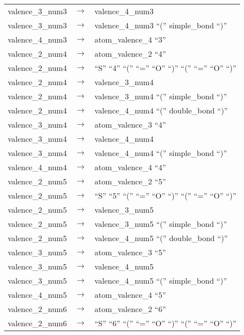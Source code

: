 \documentclass[../Document.tex]{subfiles}
\begin{document}
\begin{longtable}{m{} p{} p{}}
    valence\_3\_num3 & $\rightarrow$ & valence\_4\_num3 \\
    valence\_3\_num3 & $\rightarrow$ & valence\_4\_num3 ``('' simple\_bond ``)'' \\
    valence\_4\_num3 & $\rightarrow$ & atom\_valence\_4 ``3'' \\
    valence\_2\_num4 & $\rightarrow$ & atom\_valence\_2 ``4'' \\
    valence\_2\_num4 & $\rightarrow$ & ``S'' ``4'' ``('' ``='' ``O'' ``)'' ``('' ``='' ``O'' ``)'' \\
    valence\_2\_num4 & $\rightarrow$ & valence\_3\_num4 \\
    valence\_2\_num4 & $\rightarrow$ & valence\_3\_num4 ``('' simple\_bond ``)'' \\
    valence\_2\_num4 & $\rightarrow$ & valence\_4\_num4 ``('' double\_bond ``)'' \\
    valence\_3\_num4 & $\rightarrow$ & atom\_valence\_3 ``4'' \\
    valence\_3\_num4 & $\rightarrow$ & valence\_4\_num4 \\
    valence\_3\_num4 & $\rightarrow$ & valence\_4\_num4 ``('' simple\_bond ``)'' \\
    valence\_4\_num4 & $\rightarrow$ & atom\_valence\_4 ``4'' \\
    valence\_2\_num5 & $\rightarrow$ & atom\_valence\_2 ``5'' \\
    valence\_2\_num5 & $\rightarrow$ & ``S'' ``5'' ``('' ``='' ``O'' ``)'' ``('' ``='' ``O'' ``)'' \\
    valence\_2\_num5 & $\rightarrow$ & valence\_3\_num5 \\
    valence\_2\_num5 & $\rightarrow$ & valence\_3\_num5 ``('' simple\_bond ``)'' \\
    valence\_2\_num5 & $\rightarrow$ & valence\_4\_num5 ``('' double\_bond ``)'' \\
    valence\_3\_num5 & $\rightarrow$ & atom\_valence\_3 ``5'' \\
    valence\_3\_num5 & $\rightarrow$ & valence\_4\_num5 \\
    valence\_3\_num5 & $\rightarrow$ & valence\_4\_num5 ``('' simple\_bond ``)'' \\
    valence\_4\_num5 & $\rightarrow$ & atom\_valence\_4 ``5'' \\
    valence\_2\_num6 & $\rightarrow$ & atom\_valence\_2 ``6'' \\
    valence\_2\_num6 & $\rightarrow$ & ``S'' ``6'' ``('' ``='' ``O'' ``)'' ``('' ``='' ``O'' ``)'' \\

\end{longtable}
\end{document}
